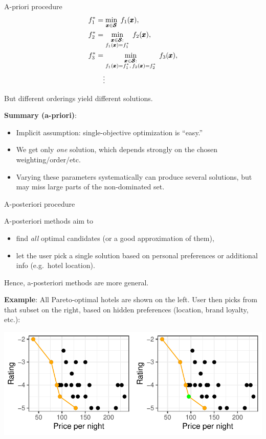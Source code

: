 \documentclass[11pt,compress,t,notes=noshow,xcolor=table]{beamer}
\newcommand{\yy}{\cost}    %
\begin{document}
\begin{vbframe}{A-priori procedure}
\[
\begin{aligned}
\yy_1^* &= \min_{\conf \in \pcs} \;\cost_1(\conf),\\
\yy_2^* &= \min_{\substack{\conf \in \pcs:\\ \cost_1(\conf)=\yy_1^*}} \;\cost_2(\conf),\\
\yy_3^* &= \min_{\substack{\conf \in \pcs:\\ \cost_1(\conf)=\yy_1^*,\,\cost_2(\conf)=\yy_2^*}} 
          \;\cost_3(\conf),\\
&\quad\vdots
\end{aligned}
\]

But different orderings yield different solutions.

{\small
\textbf{Summary (a-priori)}:
\begin{itemize}
\item Implicit assumption: single-objective optimization is “easy.”
\item We get only \emph{one} solution, which depends strongly on the chosen weighting/order/etc.
\item Varying these parameters systematically can produce several solutions, 
      but may miss large parts of the non-dominated set.
\end{itemize}
}
\end{vbframe}

\begin{vbframe}{A-posteriori procedure}

A-posteriori methods aim to
\begin{itemize}
  \item find \emph{all} optimal candidates (or a good approximation of them),
  \item let the user pick a single solution based on personal preferences or 
        additional info (e.g.\ hotel location).
\end{itemize}
Hence, a-posteriori methods are more general.

\framebreak

\textbf{Example}: 
All Pareto-optimal hotels are shown on the left. 
User then picks from that subset on the right, based on hidden preferences 
(location, brand loyalty, etc.):

\bigskip
\begin{center}
\includegraphics[scale=1]{slides/11-multicrit/figure_man/expedia-11-1.pdf}
\end{center}

\end{vbframe}
\end{document}
